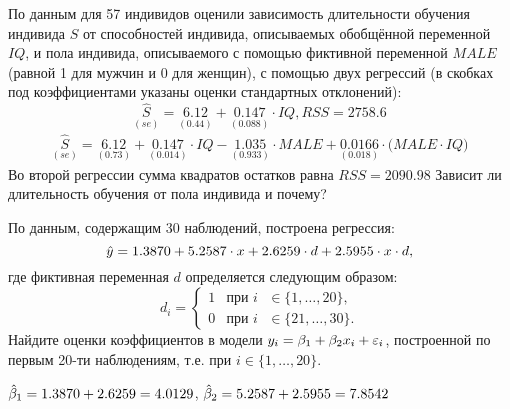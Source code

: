\begin{problem}
По данным для 57 индивидов оценили зависимость длительности обучения индивида $S$ от способностей индивида, описываемых обобщённой переменной $IQ$, и пола индивида, описываемого с помощью фиктивной переменной $MALE$ (равной 1 для мужчин и 0 для женщин), с помощью двух регрессий (в скобках под коэффициентами указаны оценки стандартных отклонений):
\[
\underset{(se)}{\hat{S}}=\underset{(0.44)}{6.12}+\underset{(0.088)}{0.147}\cdot{IQ}, RSS=2758.6
\]
\begin{multline*}
\underset{(se)}{\hat{S}}=\underset{(0.73)}{6.12}+\underset{(0.014)}{0.147}\cdot{IQ}-\underset{(0.933)}{1.035}\cdot{MALE}+\underset{(0.018)}{0.0166}\cdot{(MALE}\cdot{IQ)}
\end{multline*}
Во второй регрессии сумма квадратов остатков равна $RSS=2090.98$
Зависит ли длительность обучения от пола индивида и почему?


\begin{sol}
\end{sol}
\end{problem}



\begin{problem}
По данным, содержащим 30 наблюдений, построена регрессия:
\[
\hat{y}=1.3870+5.2587\cdot{x}+2.6259\cdot{d}+2.5955 \cdot{x} \cdot{d},
\]
где фиктивная переменная $d$ определяется следующим образом:
\[
d_i =
  \begin{cases}
    1 & \text{при $i$ $\in \bigl\{ 1,\dots,20 \bigr\} $}, \\
    0 & \text{при $i$ $\in \bigl\{ 21,\dots,30 \bigr\} $}.
 \end{cases}
\]
Найдите оценки коэффициентов в модели $y_i=\beta_1+\beta_2 x_i+\varepsilon_i$, построенной по первым 20-ти наблюдениям, т.е. при $i \in \bigl\{1,\dots,20 \bigr\}$.


\begin{sol}
$\hat{\beta}_1=1.3870+2.6259=4.0129$, $\hat{\beta}_2=5.2587+2.5955=7.8542$
\end{sol}
\end{problem}



